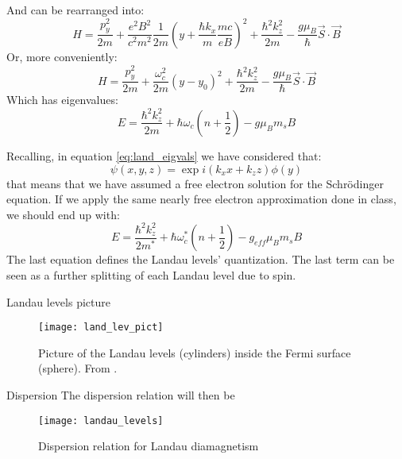 \documentclass{beamer}
\begin{document}
\begin{frame}
   And can be rearranged into:
   \begin{equation}
       H=\frac{p_y^2}{2m} + \frac{e^2B^2}{c^2m^2}\frac{1}{2m}\left(y+\frac{\hbar k_x}{m}\frac{mc}{eB}\right)^2 + \frac{\hbar^2k_z^2}{2m}-\frac{g\mu_B}{\hbar}\vec{S}\cdot\vec{B}
   \end{equation}
   Or, more conveniently:
    \begin{equation}
       H=\frac{p_y^2}{2m} + \frac{\omega_c^2}{2m}(y-y_0)^2 + \frac{\hbar^2k_z^2}{2m}-\frac{g\mu_B}{\hbar}\vec{S}\cdot\vec{B}
   \end{equation}
   Which has eigenvalues:
   \begin{equation}
       E=\frac{\hbar^2k_z^2}{2m} + \hbar\omega_c\left(n+\frac{1}{2}\right) - g\mu_Bm_sB
       \label{eq:land_eigvals}
   \end{equation}
\end{frame}
\begin{frame}
  Recalling, in equation \ref{eq:land_eigvals} we have considered that:
  \begin{equation}
      \psi(x, y, z)=\exp{i(k_xx+k_zz)}\phi(y)
      \label{eq:free_app}
  \end{equation}
  that means that we have assumed a free electron solution for the Schrödinger equation. If we apply the same nearly free electron approximation done in class, we should end up with:
     \begin{equation}
       E=\frac{\hbar^2k_z^2}{2m^*} + \hbar\omega^*_c\left(n+\frac{1}{2}\right) - g_{eff}\mu_Bm_sB
       \label{eq:land_eigvals_nfe}
   \end{equation}
  The last equation defines the Landau levels' quantization. The last term can be seen as a further splitting of each Landau level due to spin.
\end{frame}
\begin{frame}{Landau levels picture}
  \begin{figure}
      \centering
      \texttt{[image: land\_lev\_pict]}
      \caption{Picture of the Landau levels (cylinders) inside the Fermi surface (sphere). From \cite{dresselhaus}.}
      \label{fig:land_lev_pict}
  \end{figure}
\end{frame}
\begin{frame}{Dispersion}
  The dispersion relation will then be
  \begin{figure}
      \centering
      \texttt{[image: landau\_levels]}
      \caption{Dispersion relation for Landau diamagnetism}
      \label{fig:landau_diam_disp}
  \end{figure}
  
\end{frame}
\end{document}
